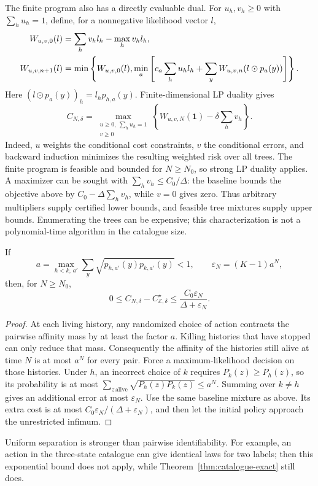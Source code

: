 The finite program also has a directly evaluable dual. For $u_h,v_h\geq0$
with $\sum_hu_h=1$, define, for a nonnegative likelihood vector $l$,
\begin{align}
 W_{u,v,0}(l)&=\sum_hv_hl_h-\max_hv_hl_h,\notag\\
 W_{u,v,n+1}(l)&=\min\left\{W_{u,v,0}(l),
 \min_a\left[c_a\sum_hu_hl_h+
       \sum_yW_{u,v,n}(l\mathbin{\odot}p_a(y))\right]\right\}.
 \label{eq:likelihood-dual-dp}
\end{align}
Here $(l\mathbin{\odot}p_a(y))_h=l_hp_{h,a}(y)$.
Finite-dimensional LP duality gives
\begin{equation}\label{eq:exact-tree-dual}
 C_{N,\delta}=\max_{\substack{u\geq0,\ \sum_hu_h=1\\v\geq0}}
 \left\{W_{u,v,N}(\mathbf1)-\delta\sum_hv_h\right\}.
\end{equation}
Indeed, $u$ weights the conditional cost constraints, $v$ the conditional
errors, and backward induction minimizes the resulting weighted risk over
all trees. The finite program is feasible and bounded for $N\geq N_0$,
so strong LP duality applies. A maximizer can be sought with
$\sum_hv_h\leq C_0/\Delta$: the baseline bounds the objective above by
$C_0-\Delta\sum_hv_h$, while $v=0$ gives zero.
Thus arbitrary multipliers supply certified lower bounds, and feasible
tree mixtures supply upper bounds. Enumerating the trees can be expensive;
this characterization is not a polynomial-time algorithm in the catalogue size.

\begin{corollary}
\label{cor:catalogue-exponential}
If
\[
 a=\max_{h<k,\,a'}\sum_y\sqrt{p_{h,a'}(y)p_{k,a'}(y)}<1,
 \qquad \varepsilon_N=(K-1)a^N,
\]
then, for $N\geq N_0$,
\begin{equation}\label{eq:catalogue-exponential}
 0\leq C_{N,\delta}-C_{\mathcal E,\delta}^\star
 \leq\frac{C_0\varepsilon_N}{\Delta+\varepsilon_N}.
\end{equation}
\end{corollary}
\begin{proof}
At each living history, any randomized choice of action contracts the
pairwise affinity mass by at least the factor $a$. Killing histories that
have stopped can only reduce that mass. Consequently the affinity of the
histories still alive at time $N$ is at most $a^N$ for every pair.
Force a maximum-likelihood decision on those histories. Under $h$, an
incorrect choice of $k$ requires $P_k(z)\geq P_h(z)$, so its probability is
at most $\sum_{z\,\mathrm{alive}}\sqrt{P_h(z)P_k(z)}\leq a^N$.
Summing over $k\ne h$ gives an additional error at most $\varepsilon_N$.
Use the same baseline mixture as above. Its extra cost is at most
$C_0\varepsilon_N/(\Delta+\varepsilon_N)$, and then let the initial
policy approach the unrestricted infimum.
\end{proof}
Uniform separation is stronger than pairwise identifiability. For example,
an action in the three-state catalogue can give identical laws for two
labels; then this exponential bound does not apply, while
Theorem~\ref{thm:catalogue-exact} still does.

